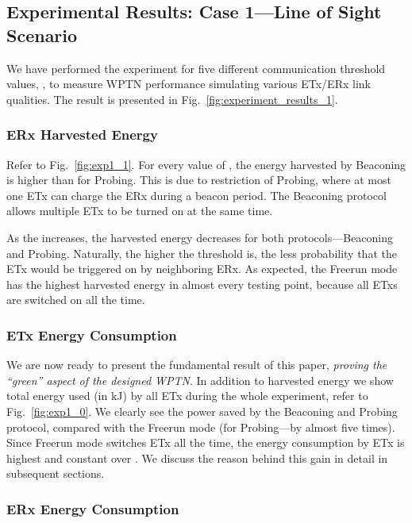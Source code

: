 \documentclass[11pt,draftclsnofoot,journal,onecolumn]{IEEEtran}
\newcommand{\txRssiThreshold}{}
\begin{document}
\subsection{Experimental Results: Case 1---Line of Sight Scenario}
\label{sec:LOS_experiment}

We have performed the experiment for five different communication threshold values, \txRssiThreshold, to measure WPTN performance simulating various ETx/ERx link qualities. The result is presented in Fig.~\ref{fig:experiment_results_1}.

\subsubsection{ERx Harvested Energy}

Refer to Fig.~\ref{fig:exp1_1}. For every value of \txRssiThreshold, the energy harvested by Beaconing is higher than for Probing. This is due to restriction of Probing, where at most one ETx can charge the ERx during a beacon period. The Beaconing protocol allows multiple ETx to be turned on at the same time.

As the \txRssiThreshold increases, the harvested energy decreases for both protocols---Beaconing and Probing. Naturally, the higher the threshold is, the less probability that the ETx would be triggered on by neighboring ERx. As expected, the Freerun mode has the highest harvested energy in almost every testing point, because all ETxs are switched on all the time.

\subsubsection{ETx Energy Consumption}

We are now ready to present the fundamental result of this paper, \emph{proving the ``green'' aspect of the designed WPTN}. In addition to harvested energy we show total energy used (in kJ) by all ETx during the whole experiment, refer to Fig.~\ref{fig:exp1_0}. We clearly see the power saved by the Beaconing and Probing protocol, compared with the Freerun mode (for Probing---by almost five times). Since Freerun mode switches ETx all the time, the energy consumption by ETx is highest and constant over \txRssiThreshold. We discuss the reason behind this gain in detail in subsequent sections.

\subsubsection{ERx Energy Consumption}
\end{document}
